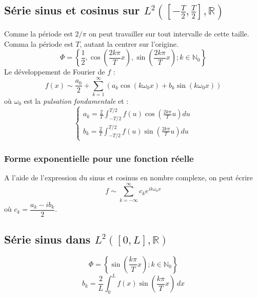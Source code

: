 \documentclass	[11pt, a4paper, openany]{book}
\newcommand{\serie}{\sum_{k=1}^\infty}
\begin{document}
			\subsection{Série sinus et cosinus sur $L^2([-\frac{T}{2}, \frac{T}{2}], \mathbb{R})$}
			Comme la période est $2/\pi$ on peut travailler sur tout  intervalle de cette taille. Comma la période est $T$, autant la centrer sur l'origine.
			\begin{equation}
				\Phi = \left\{ \frac{1}{2}, \cos\left(\frac{2k\pi}{T}x\right), \sin\left(\frac{2k\pi}{T}x\right) ; k \in \mathbb{N}_0\right\}
			\end{equation}
			Le développement de Fourier de $f$ :
			\begin{equation}
				f(x) \sim \frac{a_0}{2} + \serie (a_k\cos(k\omega_0x) + b_k\sin(k\omega_0x))
			\end{equation}
			où $\omega_0$ est la \textit{pulsation fondamentale} et :
			\begin{equation}
				\left\{\begin{array}{l}
				a_k = \frac{2}{T}\int_{-T/2}^{T/2} f(u)\cos\left(\frac{2k\pi}{T}u\right)du\\
				b_k = \frac{2}{T}\int_{-T/2}^{T/2} f(u)\sin\left(\frac{2k\pi}{T}u\right)du
				\end{array}\right.
			\end{equation}
			
			\subsubsection{Forme exponentielle pour une fonction réelle}
			A l'aide de l'expression du sinus et cosinus en nombre complexe, on peut écrire 
			\begin{equation}
				f \sim \sum_{k=-\infty}^\infty c_ke^{ik\omega_0x}
			\end{equation}
			où $c_k = \dfrac{a_k - ib_k}{2}$.
			
			\subsection{Série sinus dans $L^2([0, L], \mathbb{R})$} 
			\begin{equation}
				\Phi = \left\{\sin\left(\frac{k\pi}{T}x\right) ; k \in \mathbb{N}_0\right\}
			\end{equation}
			\begin{equation}
				b_k=\frac{2}{L}\int_0^Lf(x)\sin\left(\frac{k\pi}{T}x\right)\,dx
			\end{equation}
\end{document}
